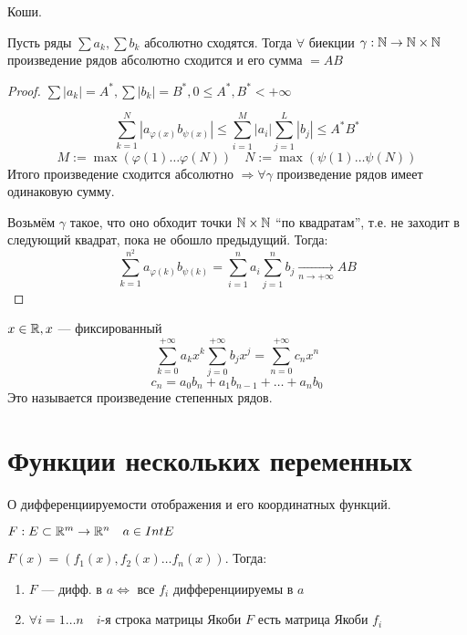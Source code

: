 \begin{theorem}
    Коши.

    Пусть ряды $\sum a_k, \sum b_k$ абсолютно сходятся. Тогда $\forall$ биекции $\gamma:\mathbb{N}\to\mathbb{N}\times\mathbb{N}$ произведение рядов абсолютно сходится и его сумма $=AB$ 
\end{theorem}
\begin{proof}
    $\sum |a_k|=A^*, \sum |b_k|=B^*, 0\le A^*,B^*<+\infty$

    $$\sum_{k=1}^N |a_{\varphi(x)}b_{\psi(x)}|\le \sum_{i=1}^{M}|a_i|\sum_{j=1}^L |b_j|\le A^*B^*$$
    $$M:=\max(\varphi(1)\ldots \varphi(N)) \quad N:=\max(\psi(1)\ldots \psi(N))$$
    Итого произведение сходится абсолютно $\Rightarrow \forall \gamma$ произведение рядов имеет одинаковую сумму.

    Возьмём $\gamma$ такое, что оно обходит точки $\mathbb{N}\times\mathbb{N}$ ``по квадратам'', т.е. не заходит в следующий квадрат, пока не обошло предыдущий. Тогда:
    $$\sum_{k=1}^{n^2}a_{\varphi(k)}b_{\psi(k)}=\sum_{i=1}^n a_i \sum_{j=1}^n b_j\xrightarrow[n\to+\infty]{}AB$$
\end{proof}

\begin{example}
    $x\in\mathbb{R}, x$ --- фиксированный
    $$\sum_{k=0}^{+\infty} a_kx^k \sum_{j=0}^{+\infty} b_jx^j = \sum_{n=0}^{+\infty} c_n x^n$$
    $$c_n=a_0b_n+a_1b_{n-1}+\ldots+a_nb_0$$
    Это называется произведение степенных рядов.
\end{example}

\section*{Функции нескольких переменных}

\begin{lemma}
    О дифференциируемости отображения и его координатных функций.

    $F : E\subset \mathbb{R}^m \to \mathbb{R}^n \quad a\in Int E$

    $F(x) = (f_1(x),f_2(x)\ldots f_n(x))$. Тогда:
    \begin{enumerate}
        \item $F$ --- дифф. в $a \Leftrightarrow$ все $f_i$ дифференциируемы в $a$
        \item $\forall i = 1\ldots n \quad i$-я строка матрицы Якоби $F$ есть матрица Якоби $f_i$
    \end{enumerate}
\end{lemma}

